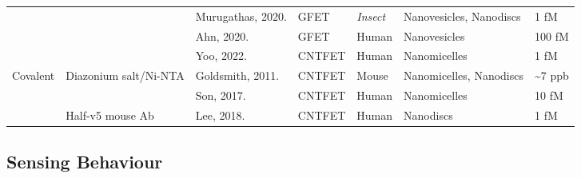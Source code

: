 \documentclass[
  a4paper,
]{scrbook}
\begin{document}
\begin{longtable}[]{@{}lllllll@{}}
& & Murugathas, 2020. \cite{Murugathas2020} & GFET & \textit{Insect} &
Nanovesicles, Nanodiscs & 1 fM \\
& & Ahn, 2020. \cite{Ahn2020} & GFET & Human & Nanovesicles & 100 fM \\
& & Yoo, 2022. \cite{Yoo2022} & CNTFET & Human & Nanomicelles & 1 fM \\
Covalent & Diazonium salt/Ni-NTA & Goldsmith, 2011. \cite{Goldsmith2011}
& CNTFET & Mouse & Nanomicelles, Nanodiscs & \textasciitilde7 ppb \\
& & Son, 2017. \cite{Son2017} & CNTFET & Human & Nanomicelles & 10 fM \\
& Half-v5 mouse Ab & Lee, 2018. \cite{Lee2018} & CNTFET & Human &
Nanodiscs & 1 fM \\
\end{longtable}

\newpage
{}

\hypertarget{sec-biosensor-methods}{%
\subsection{Sensing Behaviour}\label{sec-biosensor-methods}}
\end{document}
